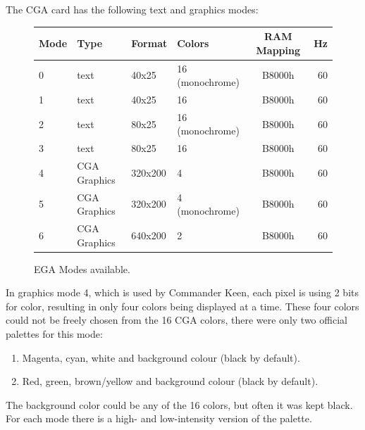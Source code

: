 \documentclass[book.tex]{subfiles}
\begin{document}
The CGA card has the following text and graphics modes:\\
\vspace{-10pt}
\begin{figure}[H]
\centering
\begin{table}[H]
\begin{tabularx}{\textwidth}[c]{llllcr}
\hline
\textbf{Mode} & \textbf{Type} & \textbf{Format} & \textbf{Colors} & \hspace{10pt}\textbf{RAM Mapping}\hspace{10pt} & \textbf{Hz}        \\ \hline
0             & text          & 40x25           & 16 (monochrome) & B8000h     & 60                           \\ \hline
1             & text          & 40x25           & 16              & B8000h    & 60                            \\ \hline
2             & text          & 80x25           & 16 (monochrome) & B8000h    & 60                            \\ \hline
3             & text          & 80x25           & 16              & B8000h    & 60                            \\ \hline
4             & CGA Graphics  & 320x200         & 4               & B8000h    & 60                            \\ \hline
5             & CGA Graphics  & 320x200         & 4 (monochrome)  & B8000h    & 60                            \\ \hline
6             & CGA Graphics  & 640x200         & 2               & B8000h    & 60                            \\ \hline

\end{tabularx}
\end{table}
\caption{EGA Modes available.}
\label{ega-modes-available}
 \end{figure} 

In graphics mode 4, which is used by Commander Keen, each pixel is using 2 bits for color, resulting in only four colors being displayed at a time. These four colors could not be freely chosen from the 16 CGA colors, there were only two official palettes for this mode:
\begin{enumerate}
  \item Magenta, cyan, white and background colour (black by default).
  \item Red, green, brown/yellow and background colour (black by default).
\end{enumerate}
The background color could be any of the 16 colors, but often it was kept black. For each mode there is a high- and low-intensity version of the palette.\\
\end{document}
